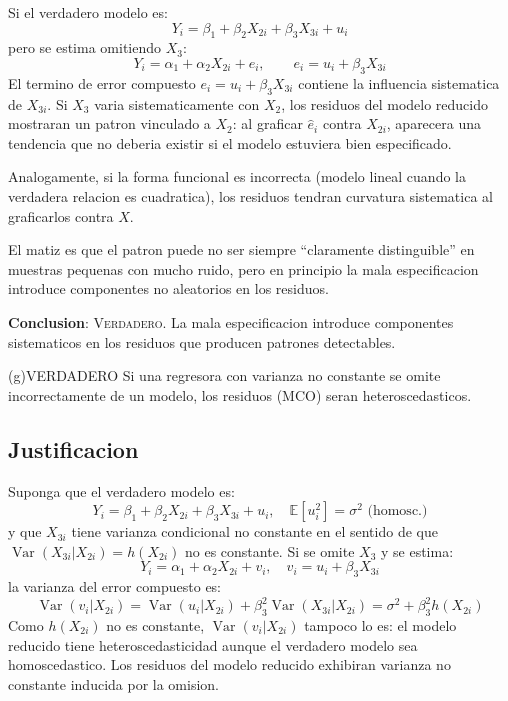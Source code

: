 \documentclass[12pt, letterpaper]{article}
\theoremstyle{remark}
\newcommand{\E}{\mathbb{E}}
\newcommand{\Var}{\operatorname{Var}}
\begin{document}
Si el verdadero modelo es:
\begin{equation}
  Y_i = \beta_1 + \beta_2 X_{2i} + \beta_3 X_{3i} + u_i
  \label{eq:verdadero}
\end{equation}
pero se estima omitiendo $X_3$:
\begin{equation}
  Y_i = \alpha_1 + \alpha_2 X_{2i} + e_i, \qquad e_i = u_i + \beta_3 X_{3i}
  \label{eq:reducido}
\end{equation}
El termino de error compuesto $e_i = u_i + \beta_3 X_{3i}$ contiene la
influencia sistematica de $X_{3i}$. Si $X_3$ varia sistematicamente con
$X_2$, los residuos del modelo reducido mostraran un patron vinculado a
$X_2$: al graficar $\hat e_i$ contra $X_{2i}$, aparecera una tendencia
que no deberia existir si el modelo estuviera bien especificado.

Analogamente, si la forma funcional es incorrecta (modelo lineal cuando
la verdadera relacion es cuadratica), los residuos tendran curvatura
sistematica al graficarlos contra $X$.

El matiz es que el patron puede no ser siempre ``claramente distinguible''
en muestras pequenas con mucho ruido, pero en principio la mala especificacion
introduce componentes no aleatorios en los residuos.

\textbf{Conclusion}: \textsc{Verdadero}. La mala especificacion introduce
componentes sistematicos en los residuos que producen patrones detectables.

\bigskip

\begin{verdict}{(g)}{VERDADERO}
  Si una regresora con varianza no constante se omite incorrectamente de un
  modelo, los residuos (MCO) seran heteroscedasticos.
\end{verdict}

\subsection*{Justificacion}

Suponga que el verdadero modelo es:
\begin{equation}
  Y_i = \beta_1 + \beta_2 X_{2i} + \beta_3 X_{3i} + u_i,
  \quad \E[u_i^2] = \sigma^2 \text{ (homosc.)}
  \label{eq:verdadero_g}
\end{equation}
y que $X_{3i}$ tiene varianza condicional no constante en el sentido de que
$\Var(X_{3i} | X_{2i}) = h(X_{2i})$ no es constante. Si se omite $X_3$ y
se estima:
\begin{equation}
  Y_i = \alpha_1 + \alpha_2 X_{2i} + v_i, \quad v_i = u_i + \beta_3 X_{3i}
  \label{eq:reducido_g}
\end{equation}
la varianza del error compuesto es:
\begin{equation}
  \Var(v_i | X_{2i})
    = \Var(u_i | X_{2i}) + \beta_3^2 \Var(X_{3i} | X_{2i})
    = \sigma^2 + \beta_3^2 h(X_{2i})
  \label{eq:var_vi}
\end{equation}
Como $h(X_{2i})$ no es constante, $\Var(v_i | X_{2i})$ tampoco lo es:
el modelo reducido tiene heteroscedasticidad aunque el verdadero modelo sea
homoscedastico. Los residuos del modelo reducido exhibiran varianza no
constante inducida por la omision.
\end{document}
